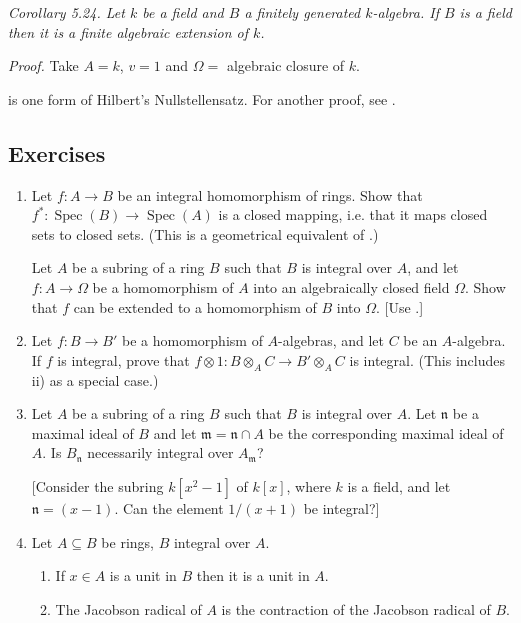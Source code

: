 \noindent\textit{Corollary 5.24. Let $k$ be a field and $B$ a finitely generated $k$-algebra. If $B$ is a field then it is a finite algebraic extension of $k$.}

\noindent\textit{Proof.} Take $A=k$, $v=1$ and $\Omega={}$ algebraic closure of $k$. \proofbox

 is one form of Hilbert's Nullstellensatz. For another proof, see .

\subsection{Exercises}

\begin{enumerate}
\item Let $f:A\longrightarrow B$ be an integral homomorphism of rings. Show that $f^*:\operatorname{Spec}(B)\longrightarrow\operatorname{Spec}(A)$ is a closed mapping, i.e. that it maps closed sets to closed sets. (This is a geometrical equivalent of .)

\amstaritem Let $A$ be a subring of a ring $B$ such that $B$ is integral over $A$, and let $f:A\longrightarrow\Omega$ be a homomorphism of $A$ into an algebraically closed field $\Omega$. Show that $f$ can be extended to a homomorphism of $B$ into $\Omega$. [Use .]

\item Let $f:B\longrightarrow B'$ be a homomorphism of $A$-algebras, and let $C$ be an $A$-algebra. If $f$ is integral, prove that $f\otimes1:B\otimes_A C\longrightarrow B'\otimes_A C$ is integral. (This includes  ii) as a special case.)

\item Let $A$ be a subring of a ring $B$ such that $B$ is integral over $A$. Let $\mathfrak n$ be a maximal ideal of $B$ and let $\mathfrak m=\mathfrak n\cap A$ be the corresponding maximal ideal of $A$. Is $B_{\mathfrak n}$ necessarily integral over $A_{\mathfrak m}$?

[Consider the subring $k[x^2-1]$ of $k[x]$, where $k$ is a field, and let $\mathfrak n=(x-1)$. Can the element $1/(x+1)$ be integral?]

\item Let $A\subseteq B$ be rings, $B$ integral over $A$.
\begin{enumerate}
\renewcommand{\labelenumii}{\roman{enumii})}
\item If $x\in A$ is a unit in $B$ then it is a unit in $A$.
\item The Jacobson radical of $A$ is the contraction of the Jacobson radical of $B$.
\end{enumerate}


\end{enumerate}
